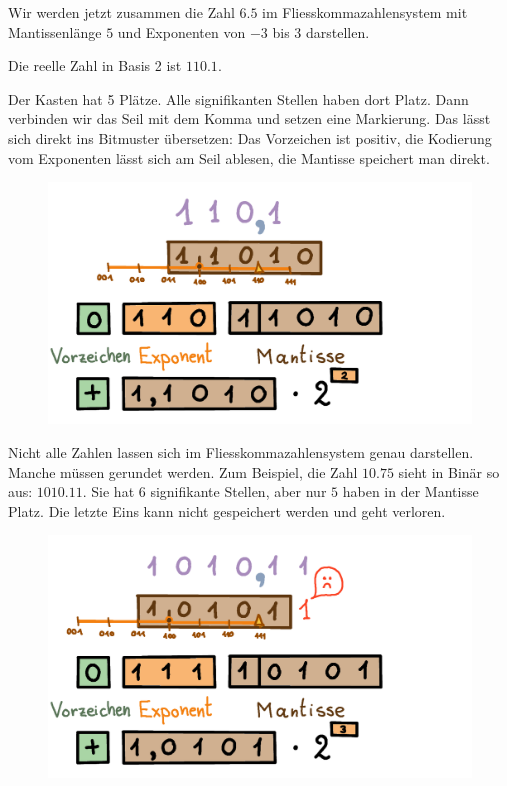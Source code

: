 \begin{beispiel}
Wir werden jetzt zusammen die Zahl \(6.5\) im Fliesskommazahlensystem mit Mantissenlänge \(5\) und Exponenten von \(-3\) bis \(3\) darstellen.

Die reelle Zahl in Basis 2 ist \(110.1\).

Der Kasten hat 5 Plätze. Alle signifikanten Stellen haben dort Platz. Dann verbinden wir das Seil mit dem Komma und setzen eine Markierung. Das lässt sich direkt ins Bitmuster übersetzen: Das Vorzeichen ist positiv, die Kodierung vom Exponenten lässt sich am Seil ablesen, die Mantisse speichert man direkt.
\begin{figure}[H]
\centering
\includegraphics[width=0.75\linewidth]{Pictures/ZahlenDarstellen6-5.png} 
\end{figure}

\end{beispiel}

\begin{beispiel}
Nicht alle Zahlen lassen sich im Fliesskommazahlensystem genau darstellen. Manche müssen gerundet werden.
Zum Beispiel, die Zahl \(10.75\) sieht in Binär so aus: \(1010.11\). Sie hat \(6\) signifikante Stellen, aber nur \(5\) haben in der Mantisse Platz. Die letzte Eins kann nicht gespeichert werden und geht verloren.
\begin{figure}[H]
\centering
\includegraphics[width=0.75\linewidth]{Pictures/ZahlenDarstellen10-75.png} 
\end{figure}

\end{beispiel}